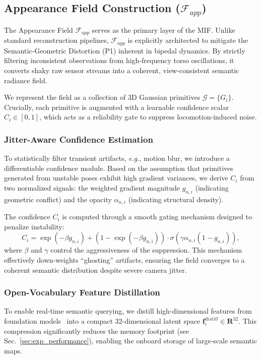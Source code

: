 \documentclass[conference]{IEEEtran}
\begin{document}
\subsection{Appearance Field Construction ($\mathcal{F}_{app}$)}
\label{sec:appearance_field}

The Appearance Field $\mathcal{F}_{app}$ serves as the primary layer of the MIF. Unlike standard reconstruction pipelines, $\mathcal{F}_{app}$ is explicitly architected to mitigate the Semantic-Geometric Distortion (P1) inherent in bipedal dynamics. By strictly filtering inconsistent observations from high-frequency torso oscillations, it converts shaky raw sensor streams into a coherent, view-consistent semantic radiance field. 

We represent the field as a collection of 3D Gaussian primitives $\mathcal{G} = \{G_i\}$. Crucially, each primitive is augmented with a learnable confidence scalar $C_i \in [0, 1]$, which acts as a reliability gate to suppress locomotion-induced noise.

\subsubsection{Jitter-Aware Confidence Estimation}
To statistically filter transient artifacts, \emph{e.g.}, motion blur, we introduce a differentiable confidence module. Based on the assumption that primitives generated from unstable poses exhibit high gradient variances, we derive $C_i$ from two normalized signals: the weighted gradient magnitude $g_{n,i}$ (indicating geometric conflict) and the opacity $\alpha_{n,i}$ (indicating structural density).

The confidence $C_i$ is computed through a smooth gating mechanism designed to penalize instability:
\begin{equation}
    C_i = \exp(-\beta g_{n,i}) + (1 - \exp(-\beta g_{n,i})) \cdot \sigma(\gamma \alpha_{n,i}(1 - g_{n,i})) \label{eq:confidence},
\end{equation}
where $\beta$ and $\gamma$ control the aggressiveness of the suppression. This mechanism effectively down-weights ``ghosting'' artifacts, ensuring the field converges to a coherent semantic distribution despite severe camera jitter.

\subsubsection{Open-Vocabulary Feature Distillation}
To enable real-time semantic querying, we distill high-dimensional features from foundation models~\cite{oquab2024dinov2, radford2021learning} into a compact 32-dimensional latent space $\mathbf{f}_i^{distill} \in \mathbf{R}^{32}$.  This compression significantly reduces the memory footprint (see Sec.~\ref{sec:exp_performance}), enabling the onboard storage of large-scale semantic maps.
\end{document}
